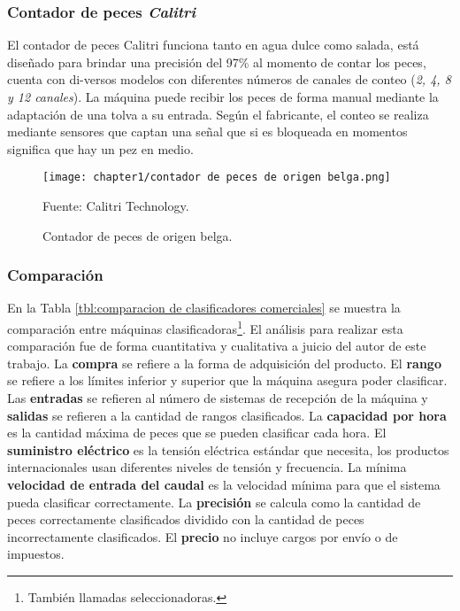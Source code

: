 \subsubsection{Contador de peces \textit{Calitri}}

El contador de peces Calitri funciona tanto en agua dulce como salada, está diseñado para brindar una precisión del 97\% al momento de contar los peces, cuenta con di-versos modelos con diferentes números de canales de conteo (\textit{2, 4, 8 y 12 canales}). La máquina puede recibir los peces de forma manual mediante la adaptación de una tolva a su entrada.\citep{Calitri2018} Según el fabricante, el conteo se realiza mediante sensores que captan una señal que si es bloqueada en momentos significa que hay un pez en medio.

\begin{figure}[H]
	\centering
	\texttt{[image: chapter1/contador de peces de origen belga.png]}
	\caption{Contador de peces de origen belga.}
	\begin{myflushleftportland}			
		Fuente: Calitri Technology.
	\end{myflushleftportland}
	\label{fig:contador de peces de origen belga}
\end{figure}

\subsubsection{Comparación}

En la Tabla \ref{tbl:comparacion de clasificadores comerciales} se muestra la comparación entre máquinas clasificadoras\footnote{También llamadas seleccionadoras.}. El análisis para realizar esta comparación fue de forma cuantitativa y cualitativa a juicio del autor de este trabajo. La \textbf{compra} se refiere a la forma de adquisición del producto. El \textbf{rango} se refiere a los límites inferior y superior que la máquina asegura poder clasificar. Las \textbf{entradas} se refieren al número de sistemas de recepción de la máquina y \textbf{salidas} se refieren a la cantidad de rangos clasificados. La \textbf{capacidad por hora} es la cantidad máxima de peces que se pueden clasificar cada hora. El \textbf{suministro eléctrico} es la tensión eléctrica estándar que necesita, los productos internacionales usan diferentes niveles de tensión y frecuencia.  La mínima \textbf{velocidad de entrada del caudal} es la velocidad mínima para que el sistema pueda clasificar correctamente. La \textbf{precisión} se calcula como la cantidad de peces correctamente clasificados dividido con la cantidad de peces incorrectamente clasificados. El \textbf{precio} no incluye cargos por envío o de impuestos.

